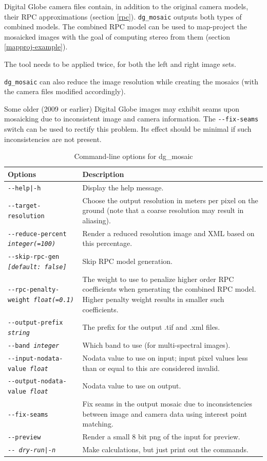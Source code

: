 Digital Globe camera files contain, in addition to the original camera
models, their RPC approximations (section
\ref{rpc}). \texttt{dg\_mosaic} outputs both types of combined
models. The combined RPC model can be used to map-project the mosaicked
images with the goal of computing stereo from them (section
\ref{mapproj-example}).

The tool needs to be applied twice, for both the left and right image sets.

\texttt{dg\_mosaic} can also reduce the image resolution while creating the
mosaics (with the camera files modified accordingly).

Some older (2009 or earlier) Digital Globe images may exhibit seams upon mosaicking
due to inconsistent image and camera information. The \texttt{-\/-fix-seams} switch
can be used to rectify this problem. Its effect should be minimal if such inconsistencies
are not present.

\begin{longtable}{|l|p{10cm}|}
\caption{Command-line options for dg\_mosaic}
\label{tbl:dgmosaic}
\endfirsthead
\endhead
\endfoot
\endlastfoot
\hline
Options & Description \\ \hline \hline
\texttt{-\/-help|-h} & Display the help message.\\ \hline
\texttt{-\/-target-resolution} &
Choose the output resolution in meters per pixel on the ground (note that a coarse resolution may result in aliasing). \\ \hline
\texttt{-\/-reduce-percent \textit{integer(=100)}} &
Render a reduced resolution image and XML based on this percentage. \\ \hline
\texttt{-\/-skip-rpc-gen \textit{[default: false]}} &
Skip RPC model generation.\\ \hline
\texttt{-\/-rpc-penalty-weight \textit{float(=0.1)}} &
The weight to use to penalize higher order RPC coefficients when generating the combined RPC model. Higher penalty weight results in smaller such coefficients.\\ \hline
\texttt{-\/-output-prefix \textit{string}} & The prefix for the output .tif and .xml files. \\ \hline
\texttt{-\/-band \textit{integer}} & Which band to use (for multi-spectral images). \\ \hline
\texttt{-\/-input-nodata-value \textit{float}} & Nodata value to use on input; input pixel values less than or equal to this are considered invalid. \\ \hline
\texttt{-\/-output-nodata-value \textit{float}} & Nodata value to use on output. \\ \hline

\texttt{-\/-fix-seams} & Fix seams in the output mosaic due to inconsistencies between image and camera data using interest point matching. \\ \hline

\texttt{-\/-preview } & Render a small 8 bit png of the input for preview. \\ \hline
\texttt{-\/- \textit{dry-run|-n}} & Make calculations, but just print out the commands. \\ \hline
\end{longtable}

